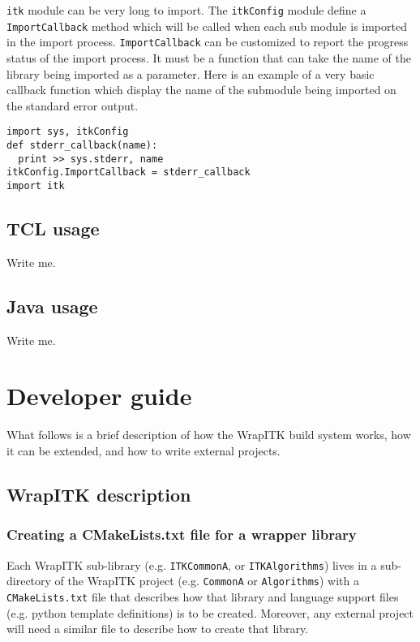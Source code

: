 \documentclass{InsightArticle}
\begin{document}
\verb$itk$ module can be very long to import. The \verb$itkConfig$ module define
a \verb$ImportCallback$ method which will be called when each sub module is
imported in the import process. \verb$ImportCallback$ can be customized to report the
progress status of the import process. It must be a function that can take
the name of the library being imported as a parameter. Here is an example of a very
basic callback function which display the name of the submodule being imported on
the standard error output.
\small \begin{verbatim}
import sys, itkConfig
def stderr_callback(name):
  print >> sys.stderr, name
itkConfig.ImportCallback = stderr_callback
import itk
\end{verbatim} \normalsize


    \subsection{TCL usage}

Write me.

    \subsection{Java usage}

Write me.

\section{Developer guide}

What follows is a brief description of how the WrapITK build system works, how
it can be extended, and how to write external projects.

  \subsection{WrapITK description}

     \subsubsection{Creating a CMakeLists.txt file for a wrapper library}
Each WrapITK sub-library (e.g. \verb$ITKCommonA$, or \verb$ITKAlgorithms$) lives in a
sub-directory of the WrapITK project (e.g. \verb$CommonA$ or \verb$Algorithms$) with a
\verb$CMakeLists.txt$ file that describes how that library  and language support files
(e.g. python template definitions) is to be created. Moreover, any external
project will need a similar file to describe how to create that library.
\end{document}
